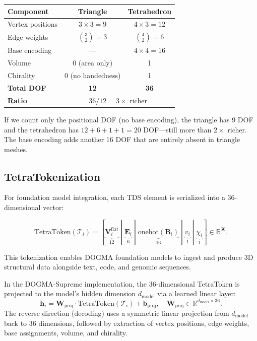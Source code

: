 \begin{center}
\renewcommand{\arraystretch}{1.15}
\begin{tabular}{lcc}
\toprule
\textbf{Component} & \textbf{Triangle} & \textbf{Tetrahedron} \\
\midrule
Vertex positions & $3 \times 3 = 9$ & $4 \times 3 = 12$ \\
Edge weights & $\binom{3}{2} = 3$ & $\binom{4}{2} = 6$ \\
Base encoding & --- & $4 \times 4 = 16$ \\
Volume & 0 (area only) & 1 \\
Chirality & 0 (no handedness) & 1 \\
\midrule
\textbf{Total DOF} & \textbf{12} & \textbf{36} \\
\midrule
\textbf{Ratio} & \multicolumn{2}{c}{$36/12 = 3\times$ richer} \\
\bottomrule
\end{tabular}
\end{center}

If we count only the positional DOF (no base encoding), the triangle has 9 DOF
and the tetrahedron has $12 + 6 + 1 + 1 = 20$ DOF---still more than $2\times$
richer. The base encoding adds another 16 DOF that are entirely absent in
triangle meshes.

\subsection{TetraTokenization}
\label{sec:tetra-tokenization}

For foundation model integration, each TDS element is serialized into a
36-dimensional vector:

\begin{equation}
\text{TetraToken}(\mathcal{T}_i) = [\underbrace{\mathbf{V}_i^{\text{flat}}}_{12} \;|\; \underbrace{\mathbf{E}_i}_{6} \;|\; \underbrace{\text{onehot}(\mathbf{B}_i)}_{16} \;|\; \underbrace{v_i}_{1} \;|\; \underbrace{\chi_i}_{1}] \in \mathbb{R}^{36}.
\label{eq:tetra-token}
\end{equation}

This tokenization enables DOGMA foundation models to ingest and produce 3D
structural data alongside text, code, and genomic sequences.

\begin{implnote}
In the DOGMA-Supreme implementation, the 36-dimensional TetraToken is projected
to the model's hidden dimension $d_{\text{model}}$ via a learned linear layer:
\[
  \mathbf{h}_i = \mathbf{W}_{\text{proj}} \cdot \text{TetraToken}(\mathcal{T}_i) + \mathbf{b}_{\text{proj}},
  \quad \mathbf{W}_{\text{proj}} \in \mathbb{R}^{d_{\text{model}} \times 36}.
\]
The reverse direction (decoding) uses a symmetric linear projection from
$d_{\text{model}}$ back to 36 dimensions, followed by extraction of vertex
positions, edge weights, base assignments, volume, and chirality.
\end{implnote}

